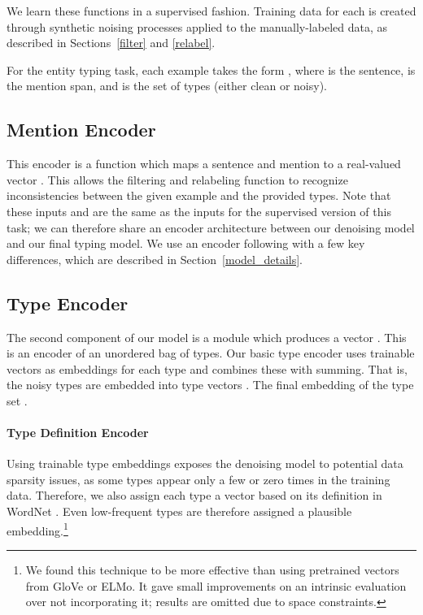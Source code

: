 \documentclass[11pt,a4paper]{article}
\begin{document}
We learn these functions in a supervised fashion. Training data for each is created through synthetic noising processes applied to the manually-labeled data, as described in Sections~\ref{filter} and \ref{relabel}.

For the entity typing task, each example  takes the form , where  is the sentence,  is the mention span, and  is the set of types (either clean or noisy).


\subsection{Mention Encoder}

This encoder is a function  which maps a sentence  and mention  to a real-valued vector . This allows the filtering and relabeling function to recognize inconsistencies between the given example and the provided types. Note that these inputs  and  are the same as the inputs for the supervised version of this task; we can therefore share an encoder architecture between our denoising model and our final typing model. We use an encoder following \citet{Eunsol_Choi_18} with a few key differences, which are described in Section~\ref{model_details}.


\subsection{Type Encoder}

The second component of our model is a module which produces a vector . This is an encoder of an unordered bag of types. Our basic type encoder uses trainable vectors as embeddings for each type and combines these with summing. That is, the noisy types  are embedded into type vectors .
The final embedding of the type set . 

\paragraph{Type Definition Encoder} Using trainable type embeddings exposes the denoising model to potential data sparsity issues, as some types appear only a few or zero times in the training data.  Therefore, we also assign each type a vector based on its definition in WordNet \cite{wordnet_1995}. Even low-frequent types are therefore assigned a plausible embedding.\footnote{We found this technique to be more effective than using pretrained vectors from GloVe or ELMo. It gave small improvements on an intrinsic evaluation over not incorporating it; results are omitted due to space constraints.}
\end{document}
